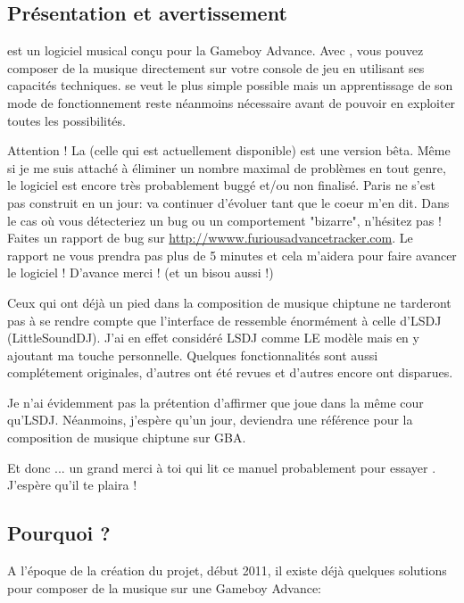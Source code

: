 \documentclass[12pt,a4paper]{article}
\begin{document}
    \subsection{Présentation et avertissement}
    \FAT est un logiciel musical conçu pour la Gameboy Advance.
    Avec \FAT, vous pouvez composer de la musique directement sur votre console de jeu en utilisant ses capacités techniques.
    \FAT se veut le plus simple possible mais un apprentissage de son mode de fonctionnement reste néanmoins nécessaire avant de pouvoir en exploiter toutes les possibilités.\medskip
    
    Attention ! La \fatversion (celle qui est actuellement disponible) est une version bêta.
    Même si je me suis attaché à éliminer un nombre maximal de problèmes en tout genre, le logiciel est encore très probablement buggé et/ou non finalisé.
    Paris ne s'est pas construit en un jour: \FAT va continuer d'évoluer tant que le coeur m'en dit.
    Dans le cas où vous détecteriez un bug ou un comportement "bizarre", n'hésitez pas !
    Faites un rapport de bug sur \url{http://wwww.furiousadvancetracker.com}.
    Le rapport ne vous prendra pas plus de 5 minutes et cela m'aidera pour faire avancer le logiciel !
    D'avance merci ! (et un bisou aussi !)
    \medskip
    
    Ceux qui ont déjà un pied dans la composition de musique chiptune ne tarderont pas à se rendre compte que l'interface de \FAT ressemble énormément à celle d'LSDJ (LittleSoundDJ).
    J'ai en effet considéré LSDJ comme LE modèle mais en y ajoutant ma touche personnelle.
    Quelques fonctionnalités sont aussi complétement originales, d'autres ont été revues et d'autres encore ont disparues.
    \medskip
    
    Je n'ai évidemment pas la prétention d'affirmer que \FAT joue dans la même cour qu'LSDJ.
    Néanmoins, j'espère qu'un jour, \FAT deviendra une référence pour la composition de musique chiptune sur GBA.\medskip
    
    Et donc ... un grand merci à toi qui lit ce manuel probablement pour essayer \FAT. J'espère qu'il te plaira !
  
    \subsection{Pourquoi \FAT ?}
    A l'époque de la création du projet, début 2011, il existe déjà quelques solutions pour composer de la musique sur une Gameboy Advance:
    \medskip
    
\end{document}
